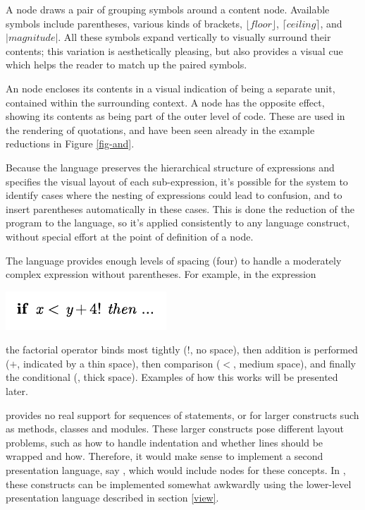 A  node draws a pair of grouping symbols around a content node. Available symbols include parentheses, various kinds of brackets, $\lfloor\mathit{floor}\rfloor$, $\lceil\mathit{ceiling}\rceil$, and $|\mathit{magnitude}|$. All these symbols expand vertically to visually surround their contents; this variation is aesthetically pleasing, but also provides a visual cue which helps the reader to match up the paired symbols.

An  node encloses its contents in a visual indication of being a separate unit, contained within the surrounding context. A  node has the opposite effect, showing its contents as being part of the outer level of code. These are used in the rendering of quotations, and have been seen already in the example reductions in Figure \ref{fig-and}.

Because the  language preserves the hierarchical structure of expressions and specifies the visual layout of each sub-expression, it's possible for the system to identify cases where the nesting of expressions could lead to confusion, and to insert parentheses automatically in these cases. This is done  the reduction of the program to the  language, so it's applied consistently to any language construct, without special effort at the point of definition of a node. 

The  language provides enough levels of spacing (four) to handle a moderately complex expression without parentheses. For example, in the expression\begin{center}
\includegraphics{src/image/space.pdf}
\end{center}
the factorial operator binds most tightly ($!$, no space), then addition is performed ($+$, indicated by a thin space), then comparison ($<$, medium space), and finally the conditional (, thick space). Examples of how this works will be presented later.



 provides no real support for sequences of statements, or for larger constructs such as methods, classes and modules. These larger constructs pose different layout problems, such as how to handle indentation and whether lines should be wrapped and how. Therefore, it would make sense to implement a second presentation language, say , which would include nodes for these concepts. In \Meta, these constructs can be implemented somewhat awkwardly using the lower-level presentation language described in section \ref{view}.

